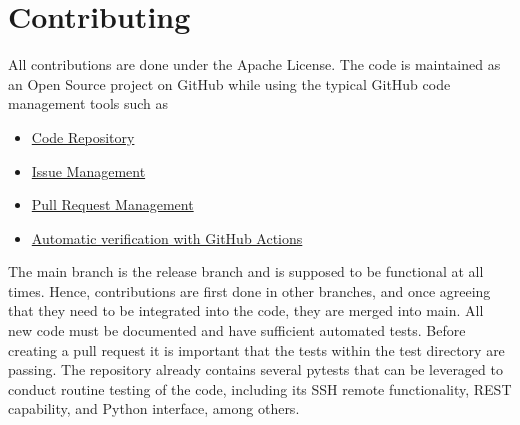 
\section{Contributing}\label{contributing}

All contributions are done under the Apache License. 
The code is maintained as an Open Source project on GitHub while using the typical GitHub code management tools such as 

\begin{itemize}
\item
  \href{https://github.com/cloudmesh/cloudmesh-cc}{Code Repository}
\item
  \href{https://github.com/cloudmesh/cloudmesh-cc/issues}{Issue Management}
\item
  \href{https://github.com/cloudmesh/cloudmesh-cc/pulls}{Pull Request Management}
\item
  \href{https://github.com/cloudmesh/cloudmesh-cc/actions}{Automatic verification with GitHub Actions}
\end{itemize}

The main branch is the release branch and is supposed to be functional at all times. Hence, contributions are
first done in other branches, and once agreeing that they need to be
integrated into the code, they are merged into main. All new code
must be documented and have sufficient automated tests.
Before creating a pull request it is important that the tests within the
test directory are passing.
The repository already contains several pytests that can be leveraged to conduct routine testing of the code, including its SSH remote functionality, REST capability, and Python interface, among others.
